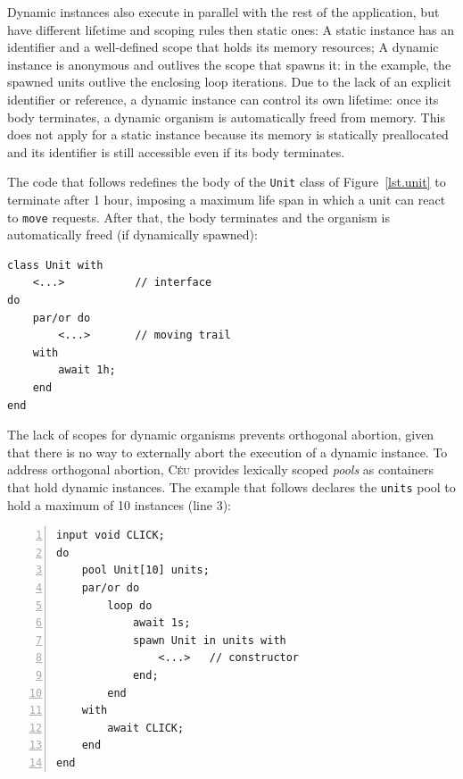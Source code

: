 \documentclass{acm_proc_article-sp}
\newcommand{\CEU}{\textsc{C\'{e}u}\xspace}
\newcommand{\code}[1] {{\small{\texttt{#1}}}}
\newcommand{\1}{\;}
\newcommand{\2}{\;\;}
\newcommand{\3}{\;\;\;}
\newcommand{\5}{\;\;\;\;\;}
\begin{document}
Dynamic instances also execute in parallel with the rest of the application, 
but have different lifetime and scoping rules then static ones:
%
A static instance has an identifier and a well-defined scope that holds its 
memory resources;
A dynamic instance is anonymous and outlives the scope that spawns it:
in the example, the spawned units outlive the enclosing loop iterations.
%
Due to the lack of an explicit identifier or reference, a dynamic instance can 
control its own lifetime:
once its body terminates, a dynamic organism is automatically freed from 
memory.
%
This does not apply for a static instance because its memory is statically 
preallocated and its identifier is still accessible even if its body 
terminates.

The code that follows redefines the body of the \code{Unit} class of 
Figure~\ref{lst.unit} to terminate after 1 hour, imposing a maximum life span 
in which a unit can react to \code{move} requests.
After that, the body terminates and the organism is automatically freed (if 
dynamically spawned):

\begin{lstlisting}
class Unit with
    <...>           // interface
do
    par/or do
        <...>       // moving trail
    with
        await 1h;
    end
end
\end{lstlisting}

The lack of scopes for dynamic organisms prevents orthogonal abortion, given 
that there is no way to externally abort the execution of a dynamic instance.
%
To address orthogonal abortion, \CEU provides lexically scoped \emph{pools} as 
containers that hold dynamic instances.
%
The example that follows declares the \code{units} pool to hold a maximum of 10 
instances (line 3):


\begin{lstlisting}[numbers=left,xleftmargin=3em]
input void CLICK;
do
    pool Unit[10] units;
    par/or do
        loop do
            await 1s;
            spawn Unit in units with
                <...>   // constructor
            end;
        end
    with
        await CLICK;
    end
end
\end{lstlisting}
\end{document}
